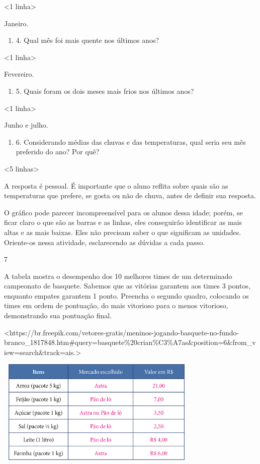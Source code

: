 {{{{{{{{{{{{{{{{{\textless{}1 linha\textgreater{}

Janeiro.

\begin{enumerate}
\def\labelenumi{\alph{enumi})}
\item
4. Qual mês foi mais quente nos últimos anos?
\end{enumerate}

\textless{}1 linha\textgreater{}

Fevereiro.

\begin{enumerate}
\def\labelenumi{\alph{enumi})}
\item
5. Quais foram os dois meses mais frios nos últimos anos?
\end{enumerate}

\textless{}1 linha\textgreater{}

Junho e julho.

\begin{enumerate}
\def\labelenumi{\alph{enumi})}
\item
6. Considerando médias das chuvas e das temperaturas, qual seria seu mês preferido do ano? Por quê?
\end{enumerate}

\textless{}5 linhas\textgreater{}

A resposta é pessoal. É importante que o aluno reflita sobre quais são as temperaturas que prefere, se gosta ou não de chuva, antes de definir sua resposta.

O gráfico pode parecer incompreensível para os alunos dessa idade; porém, se ficar claro o que são as barras e as linhas, eles
conseguirão identificar as mais altas e as mais baixas. Eles não
precisam saber o que significam as unidades. Oriente-os nessa atividade, esclarecendo as dúvidas a cada passo.

\num{7}

A tabela mostra o desempenho dos 10 melhores times de um
determinado campeonato de basquete. Sabemos que as vitórias garantem aos
times 3 pontos, enquanto empates garantem 1 ponto. Preencha o segundo quadro,
colocando os times em ordem de pontuação, do mais vitorioso para o menos
vitorioso, demonstrando sua pontuação final.

\textless{}https://br.freepik.com/vetores-gratis/meninos-jogando-basquete-no-fundo-branco\_1817848.htm\#query=basquete\%20crian\%C3\%A7as\&position=6\&from\_view=search\&track=ais.\textgreater{}

\includegraphics[width=3.83333in,height=1.97257in]{media/image93.png}

}}}}}}}}}}}}}}}}}
